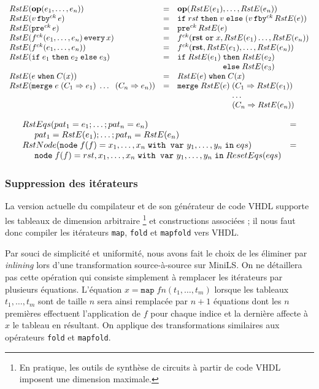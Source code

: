 \documentclass[a4paper]{article}
\newcommand{\mybox}[1]{\mbox{\tt{#1}}}
\newcommand{\ind}[0]{\hspace{0.5cm}}
\newcommand{\Node}[4]{\mybox{node} \; f(#1) = #2 \; \mybox{with var} \
  #3 \; \mybox{in} \; #4}
\newcommand{\Op}[2]{\mybox{\bf{op}}(#1,\dots,#2)}
\newcommand{\Fby}[2]{#1 \, \mybox{fby}^{ck} \, #2}
\newcommand{\Pre}[1]{\mybox{pre}^{ck} \, #1}
\newcommand{\Every}[4]{#1^{ck}(#2,\dots,#3) \, \mybox{every} \, #4}
\newcommand{\App}[2]{#1^{ck}(#2)}
\newcommand{\If}[3]{\mybox{if} \; #1 \; \mybox{then} \; #2 \; \mybox{else} \; #3}
\newcommand{\When}[3]{#1 \; \mybox{when} \; #2(#3)}
\newcommand{\Merge}[5]{\mybox{merge} \; #1 \; (#2 \Rightarrow #3) \; \dots \; \
  (#4 \Rightarrow #5)}
\newcommand{\Map}[3]{\mathtt{map} \; #1 n (#2,\dots,#3)}
\begin{document}
\[
\begin{array}{lcl}
  \re{\Op{e_1}{e_n}} & = & \Op{\re{e_1}}{\re{e_n}} \\
  \re{\Fby{v}{e}} & = & \If{rst}{v}{(\Fby{v}{\re{e}})} \\
  \re{\Pre{e}} & = & \Pre{\re{e}} \\
  \re{\Every{f}{e_1}{e_n}{x}} & = & \App{f}{\mathbf{rst} \; \mathtt{or} \;
    x, \re{e_1} \dots, \re{e_n}} \\
  \re{\App{f}{e_1,\dots,e_n}} & = &
  \App{f}{\mathbf{rst},\re{e_1},\dots,\re{e_n}} \\
  \re{\If{e_1}{e_2}{e_3}} & = & \If{\re{e_1}}{\re{e_2}\\ & & \hspace{1.9cm}}
  {\re{e_3}} \\
  \re{\When{e}{C}{x}} & = & \When{\re{e}}{C}{x} \\
  \re{\Merge{e}{C_1}{e_1}{C_n}{e_n}} & = &
  \mybox{merge} \; \re{e} \; (C_1 \Rightarrow \re{e_1}) \\
  & & \hspace{2.4cm} \dots \\
  & & \hspace{2.4cm} (C_n \Rightarrow \re{e_n})
\end{array}
\]

\[
\begin{array}{ll}
  RstEqs(pat_1 = e_1;\dots;pat_n = e_n) & = \\
  \ind pat_1 = \re{e_1};\dots;pat_n = \re{e_n} \\
  \rstn{\Node{f}{x_1,\dots,x_n}{y_1,\dots,y_n}{eqs}} & = \\
  \ind \Node{f}{rst,x_1,\dots,x_n}{y_1,\dots,y_n}{ResetEqs(eqs)}
\end{array}
\]

\subsubsection{Suppression des it\'erateurs}

La version actuelle du compilateur et de son g\'en\'erateur de code VHDL supporte
les tableaux de dimension arbitraire \footnote{En pratique, les outils de
  synth\`ese de circuits \`a partir de code VHDL imposent une dimension maximale.}
et constructions associ\'ees ; il nous faut donc compiler les it\'erateurs
\texttt{map}, \texttt{fold} et \texttt{mapfold} vers VHDL.

Par souci de simplicit\'e et uniformit\'e, nous avons fait le choix de les \'eliminer
par \textit{inlining} lors d'une transformation source-\`a-source sur MiniLS. On
ne d\'etaillera pas cette op\'eration qui consiste simplement \`a remplacer les
it\'erateurs par plusieurs \'equations. L'\'equation $x = \Map{f}{t_1}{t_m}$ lorsque
les tableaux $t_1, \dots, t_m$ sont de taille $n$ sera ainsi remplac\'ee par $n +
1$ \'equations dont les $n$ premi\`eres effectuent l'application de $f$ pour chaque
indice et la derni\`ere affecte \`a $x$ le tableau en r\'esultant. On applique des
transformations similaires aux op\'erateurs \texttt{fold} et \texttt{mapfold}.
\end{document}
